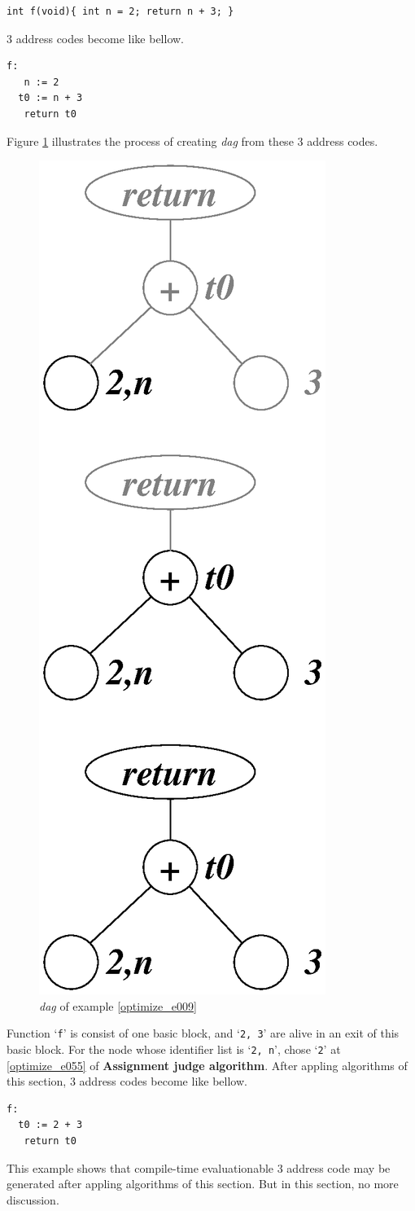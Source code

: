 \begin{Example}
\label{optimize_e009}
\begin{verbatim}
int f(void){ int n = 2; return n + 3; }
\end{verbatim}
3 address codes become like bellow.
\begin{verbatim}
f:
   n := 2
  t0 := n + 3
   return t0
\end{verbatim}
Figure \ref{optimize_e010} illustrates the process of creating
{\em dag} from these 3 address codes.
\begin{figure}[htbp]
\begin{center}
\includegraphics[width=0.392\linewidth,height=1.0\linewidth]{opt002.eps}
\caption{{\em dag} of example \ref{optimize_e009}}
\label{optimize_e010}
\end{center}
\end{figure}
Function `{\tt{f}}' is consist of one basic block, and 
`{\tt{2, 3}}' are alive in an exit of this basic block.
For the node whose identifier list is `{\tt{2, n}}',
chose `{\tt{2}}' at \ref{optimize_e055} of {\bf Assignment judge algorithm}.
After appling algorithms of this section,
3 address codes become like bellow.
\begin{verbatim}
f:
  t0 := 2 + 3
   return t0
\end{verbatim}
This example shows that
compile-time evaluationable 3 address code may be generated
after appling algorithms of this section. But in this section,
no more discussion.
\end{Example}

